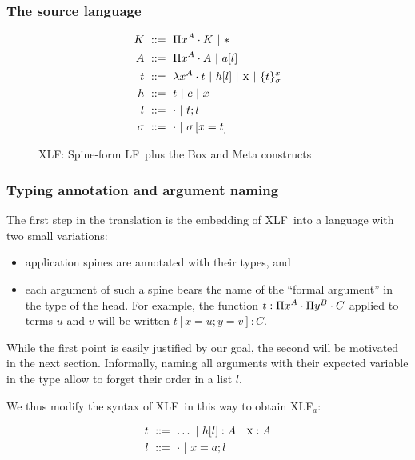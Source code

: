 \documentclass[preprint]{sigplanconf}
\newcommand\gor{\ |\ }
\newcommand\gequal{\ ::=\ }
\newcommand\meta[1]{\ensuremath\textsc{#1}}
\newcommand\ameta[2]{\ensuremath\meta{#1}:{#2}}
\newcommand\postbinder{\cdot}
\newcommand\prd[2]{\ensuremath\Pi{#1}^{#2}\postbinder}
\newcommand\tlam[2]{\ensuremath\lambda{#1}^{#2}\postbinder}
\newcommand\lam{\tlam}
\newcommand\obox[3]{\ensuremath\{{#1}\}^{#2}_{#3}}
\newcommand\srt[1]{\ensuremath\mathsf{#1}}
\newcommand\type{\srt *}
\newcommand\lapp[2]{{#1}[{#2}]}
\newcommand\laapp[3]{{#1}[{#2}]:{#3}}
\newcommand\lnil{\cdot}
\newcommand\lcons[2]{{#1};{#2}}
\newcommand\lncons[3]{{#1}={#2};{#3}}
\newcommand\lnsing[2]{{#1}={#2}}
\newcommand\enil\cdot
\newcommand\snil\enil
\newcommand\sent[2]{\left[{#1}={#2}\right]}
\newcommand\scons[3]{{#1}\sent{#2}{#3}}
\newcommand\lang[1]{\textsf{#1}}
\newcommand\LF{\lang{LF}}
\newcommand\XLF{\lang{XLF}}
\newcommand\XLFa{\lang{XLF$_a$}}
\begin{document}
\subsubsection{The source language}

\begin{figure}
  \begin{align*}
    K &\gequal { \prd x A K \gor \type } \\
    A &\gequal { \prd x A A \gor \lapp a l } \\
    t &\gequal { \lam x A t \gor \lapp h l \gor \meta x \gor \obox t x
      \sigma } \\
    h &\gequal { t \gor c \gor x } \\
    l &\gequal { \lnil \gor \lcons t l } \\
    \sigma &\gequal { \snil \gor \scons \sigma x t } %
  \end{align*}
  \caption{\XLF: Spine-form \LF\ plus the \textsf{Box} and \textsf{Meta} constructs}
\end{figure}

\subsubsection{Typing annotation and argument naming}

The first step in the translation is the embedding of \XLF\ into a
language with two small variations:
\begin{itemize}
\item application spines are annotated with their types, and
\item each argument of such a spine bears the name of the ``formal
  argument'' in the type of the head. For example, the function $t :
  \prd x A \prd y B C$ applied to terms $u$ and $v$ will be written
  $\laapp{t}{\lncons x u {\lnsing y v}} C$.
\end{itemize}

While the first point is easily justified by our goal, the second will
be motivated in the next section. Informally, naming all arguments
with their expected variable in the type allow to forget their order
in a list $l$.

We thus modify the syntax of \XLF\ in this way to obtain \XLFa:

\begin{align*}
  t &\gequal \ldots \gor \laapp h l A \gor \ameta x A \\
  l &\gequal \lnil \gor \lncons x a l
\end{align*}
\end{document}
